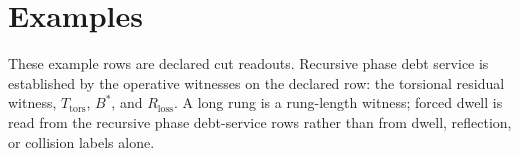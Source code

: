 \section{Examples}

These example rows are declared cut readouts. Recursive phase debt service is established by the operative witnesses on the declared row: the torsional residual witness, $T_{\mathrm{tors}}$, $B^*$, and $R_{\mathrm{loss}}$. A long rung is a rung-length witness; forced dwell is read from the recursive phase debt-service rows rather than from dwell, reflection, or collision labels alone.





